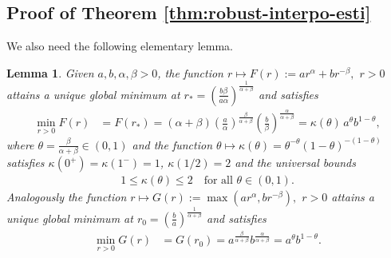 \documentclass[12pt, reqno]{amsart}%
\theoremstyle{plain}  %
\newtheorem{lemma}[theorem]{Lemma}
\theoremstyle{definition}  %
\theoremstyle{remark}
\numberwithin{equation}{section}
\begin{document}
\subsection{Proof of Theorem \ref{thm:robust-interpo-esti} } \label{sec:robust-interpo-esti}
We also need the following elementary lemma.
\begin{lemma}
\label{lem:min-power-interpolation}
Given $a, b, \alpha, \beta > 0$,   the function $r\mapsto F(r) := a r^\alpha + b r^{-\beta},$ $r>0$ attains a unique global minimum at $r_* = \left( \frac{b \beta}{a \alpha} \right)^{\frac{1}{\alpha + \beta}}$ and satisfies
\begin{align*}
\min_{r > 0} F(r)
&= F(r_*) = (\alpha + \beta) \left( \frac{a}{\alpha} \right)^{\frac{\beta}{\alpha + \beta}} \left( \frac{b}{\beta} \right)^{\frac{\alpha}{\alpha + \beta}} = \kappa(\theta)\, a^{\theta} b^{1 - \theta},
\end{align*}
where $\theta = \frac{\beta}{\alpha + \beta} \in (0,1)$ and  the function $\theta \mapsto \kappa(\theta)=\theta^{-\theta}(1 - \theta)^{-(1-\theta)} $ satisfies  $\kappa(0^+) =\kappa(1^-) =1$, $\kappa(1/2)=2 $  and the universal bounds
\begin{align*}
1\leq \kappa(\theta) \leq 2 \quad \text{for all } \theta \in (0,1).
\end{align*}
Analogously the function $r\mapsto G(r) := \max(a r^\alpha, b r^{-\beta}),$ $r>0$ attains a unique global minimum at $r_0 = \left( \frac{b}{a} \right)^{\frac{1}{\alpha + \beta}}$ and satisfies
\begin{align*}
\min_{r > 0} G(r)
&= G(r_0) = a^{\frac{\beta}{\alpha + \beta}} b^{\frac{\alpha}{\alpha + \beta}} = a^{\theta} b^{1 - \theta}.
\end{align*}
\end{lemma}
\end{document}
